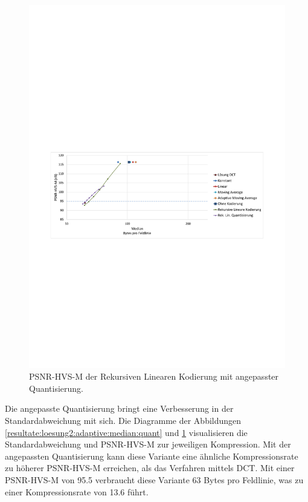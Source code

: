 \begin{figure}[!htbp]
\center
	\includegraphics[trim = 1.8cm 11cm 1.8cm 12.5cm, clip=true,width=1\textwidth,keepaspectratio]{./pictures/resultate/loesung2/variante3/resultate_psnr.pdf}
	\caption{PSNR-HVS-M der Rekursiven Linearen Kodierung mit angepasster Quantisierung.}
	\label{resultate:loesung2:adaptive:median:quant_psnr}
\end{figure}
Die angepasste Quantisierung bringt eine Verbesserung in der Standardabweichung mit sich. Die Diagramme der Abbildungen \ref{resultate:loesung2:adaptive:median:quant} und \ref{resultate:loesung2:adaptive:median:quant_psnr} visualisieren die Standardabweichung und PSNR-HVS-M zur jeweiligen Kompression. Mit der angepassten Quantisierung kann diese Variante eine ähnliche Kompressionsrate zu höherer PSNR-HVS-M erreichen, als das Verfahren mittels DCT. Mit einer PSNR-HVS-M von 95.5 verbraucht diese Variante 63 Bytes pro Feldlinie, was zu einer Kompressionsrate von 13.6 führt.

